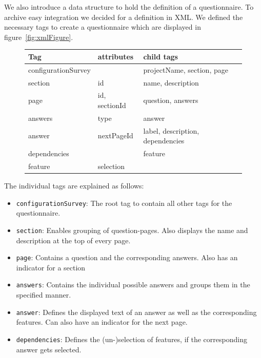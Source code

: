 We also introduce a data structure to hold the definition of a questionnaire. To archive easy integration we decided for a definition in XML. We defined the necessary tags to create a questionnaire which are displayed in figure~\ref{fig:xmlFigure}.

\begin{figure}[H]
\begin{tabulary}{\linewidth}{LLL}
\textbf{Tag} & \textbf{attributes} & \textbf{child tags}\\
\hline
configurationSurvey & & projectName, section, page\\
section & id & name, description\\
page & id, sectionId & question, answers\\
answers & type & answer\\
answer & nextPageId & label, description, dependencies\\
dependencies & & feature\\
feature & selection & \\
\end{tabulary}\vspace{2.5em}
\end{figure}

The individual tags are explained as follows:
\begin{itemize}
\item \texttt{configurationSurvey}: The root tag to contain all other tags for the questionnaire.
\item \texttt{section}: Enables grouping of question-pages. Also displays the name and description at the top of every page.
\item \texttt{page}: Contains a question and the corresponding answers. Also has an indicator for a section
\item \texttt{answers}: Contains the individual possible answers and groups them in the specified manner.
\item \texttt{answer}: Defines the displayed text of an answer as well as the corresponding features. Can also have an indicator for the next page.
\item \texttt{dependencies}: Defines the (un-)selection of features, if the corresponding answer gets selected.
\end{itemize}

